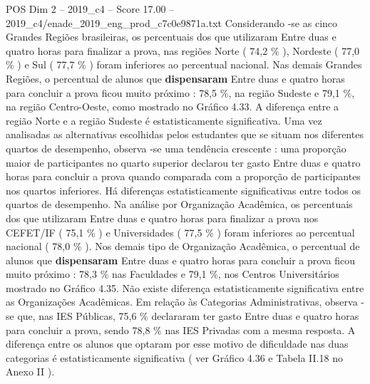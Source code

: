 \begin{textsample}{POS Dim 2 – 2019\_c4 – Score 17.00 – 2019\_c4/enade\_2019\_eng\_prod\_c7c0e9871a.txt}
Considerando -se as cinco Grandes Regiões brasileiras, os percentuais dos que utilizaram Entre duas e quatro horas para finalizar a prova, nas regiões Norte ( 74,2 \% ), Nordeste ( 77,0 \% ) e Sul ( 77,7 \% ) foram inferiores ao percentual nacional.
Nas demais Grandes Regiões, o percentual de alunos que \textbf{dispensaram} Entre duas e quatro horas para concluir a prova ficou muito próximo : 78,5 \%, na região Sudeste e 79,1 \%, na região Centro-Oeste, como mostrado no Gráfico 4.33.
A diferença entre a região Norte e a região Sudeste é estatisticamente significativa.
Uma vez analisadas as alternativas escolhidas pelos estudantes que se situam nos diferentes quartos de desempenho, observa -se uma tendência crescente : uma proporção maior de participantes no quarto superior declarou ter gasto Entre duas e quatro horas para concluir a prova quando comparada com a proporção de participantes nos quartos inferiores.
Há diferenças estatisticamente significativas entre todos os quartos de desempenho.
Na análise por Organização Acadêmica, os percentuais dos que utilizaram Entre duas e quatro horas para finalizar a prova nos CEFET/IF ( 75,1 \% ) e Universidades ( 77,5 \% ) foram inferiores ao percentual nacional ( 78,0 \% ).
Nos demais tipo de Organização Acadêmica, o percentual de alunos que \textbf{dispensaram} Entre duas e quatro horas para concluir a prova ficou muito próximo : 78,3 \% nas Faculdades e 79,1 \%, nos Centros Universitários mostrado no Gráfico 4.35.
Não existe diferença estatisticamente significativa entre as Organizações Acadêmicas.
Em relação às Categorias Administrativas, observa -se que, nas IES Públicas, 75,6 \% declararam ter gasto Entre duas e quatro horas para concluir a prova, sendo 78,8 \% nas IES Privadas com a mesma resposta.
A diferença entre os alunos que optaram por esse motivo de dificuldade nas duas categorias é estatisticamente significativa ( ver Gráfico 4.36 e Tabela II.18 no Anexo II ).

\end{textsample}
